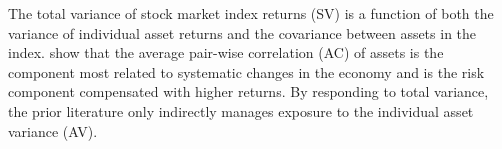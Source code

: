 The total variance of stock market index returns (SV) is a function of both the variance of individual asset returns and the covariance between assets in the index. \citet{pollet_average_2010} show that the average pair-wise correlation (AC) of assets is the component most related to systematic changes in the economy and is the risk component compensated with higher returns. By responding to total variance, the prior literature only indirectly manages exposure to the individual asset variance (AV). 

